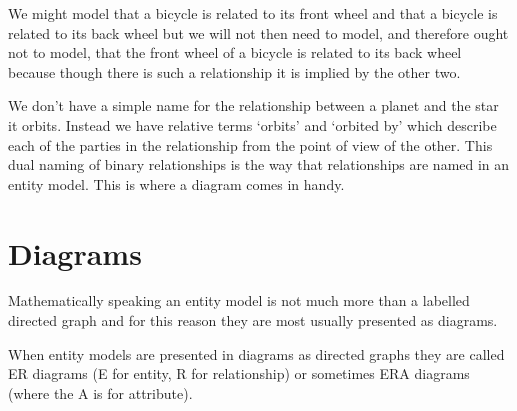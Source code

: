 \mynote We might model that a bicycle is related to its front wheel and that a bicycle is related to its back wheel but we will not then need to model,  and therefore ought not to model, that the front wheel of a bicycle is related to its back wheel because though there is such a relationship it is implied by the other two.  

\mynote 
We don't have a simple name for the relationship between a planet and the star it orbits. Instead we have  relative terms `orbits' and `orbited by' which describe each of the parties in the relationship from the point of view of the other. This dual naming of binary relationships is the way that relationships are named in an entity model. 
This is where a diagram comes in handy.

\section{Diagrams}
  
\mynote Mathematically speaking an entity model is not much more than a labelled directed graph and for this reason they are most usually presented as diagrams.

\mynote When entity models are presented in diagrams as directed graphs
they are called ER diagrams (E for entity, R for relationship) or sometimes
ERA diagrams (where the A is for attribute). 